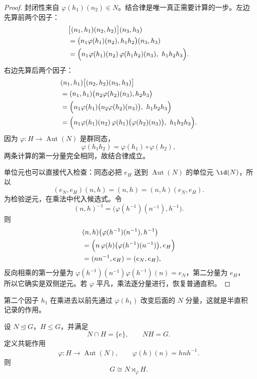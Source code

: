 \begin{proof}
封闭性来自 $\varphi(h_1)(n_2)\in N$。结合律是唯一真正需要计算的一步。左边先算前两个因子：
\begin{align*}
&\bigl[(n_1,h_1)(n_2,h_2)\bigr](n_3,h_3)\\
&=\bigl(n_1\varphi(h_1)(n_2),h_1h_2\bigr)(n_3,h_3)\\
&=\Bigl(n_1\varphi(h_1)(n_2)\,
\varphi(h_1h_2)(n_3),\ h_1h_2h_3\Bigr).
\end{align*}
右边先算后两个因子：
\begin{align*}
&(n_1,h_1)\bigl[(n_2,h_2)(n_3,h_3)\bigr]\\
&=(n_1,h_1)\bigl(n_2\varphi(h_2)(n_3),h_2h_3\bigr)\\
&=\Bigl(n_1\varphi(h_1)\bigl(n_2\varphi(h_2)(n_3)\bigr),\ h_1h_2h_3\Bigr)\\
&=\Bigl(n_1\varphi(h_1)(n_2)\,
\varphi(h_1)\bigl(\varphi(h_2)(n_3)\bigr),\ h_1h_2h_3\Bigr).
\end{align*}
因为 $\varphi:H\to\operatorname{Aut}(N)$ 是群同态，
\[
\varphi(h_1h_2)=\varphi(h_1)\circ\varphi(h_2),
\]
两条计算的第一分量完全相同，故结合律成立。

单位元也可以直接代入检查：同态必把 $e_H$ 送到 $\operatorname{Aut}(N)$ 的单位元 $\id(N)$，所以
\[
(e_N,e_H)(n,h)=(n,h)=(n,h)(e_N,e_H).
\]
为检验逆元，在乘法中代入候选式。令
\[
(n,h)^{-1}=\bigl(\varphi(h^{-1})(n^{-1}),h^{-1}\bigr).
\]
则
\begin{align*}
&(n,h)\bigl(\varphi(h^{-1})(n^{-1}),h^{-1}\bigr)\\
&=\Bigl(n\,\varphi(h)\bigl(\varphi(h^{-1})(n^{-1})\bigr),e_H\Bigr)\\
&=(nn^{-1},e_H)=(e_N,e_H),
\end{align*}
反向相乘的第一分量为
$\varphi(h^{-1})(n^{-1})\varphi(h^{-1})(n)=e_N$，第二分量为 $e_H$，
所以它确实是双侧逆元。若 $\varphi$ 平凡，乘法逐分量进行，恢复普通直积。
\end{proof}

第二个因子 $h_1$ 在乘进去以前先通过 $\varphi(h_1)$ 改变后面的 $N$ 分量，这就是半直积记录的作用。

\begin{theorem}[内半直积判据]
设 $N\mathrel{\trianglelefteq} G$，$H\leqslant G$，并满足
\[
N\cap H=\{e\},
\qquad
NH=G.
\]
定义共轭作用
\[
\varphi:H\to\operatorname{Aut}(N),
\qquad
\varphi(h)(n)=hnh^{-1}.
\label{eq:conjugation-action}
\]
则
\[
G\cong N\rtimes_{\varphi}H.
\label{eq:internal-semidirect-product}
\]
\label{thm:internal-semidirect-product}

\end{theorem}


